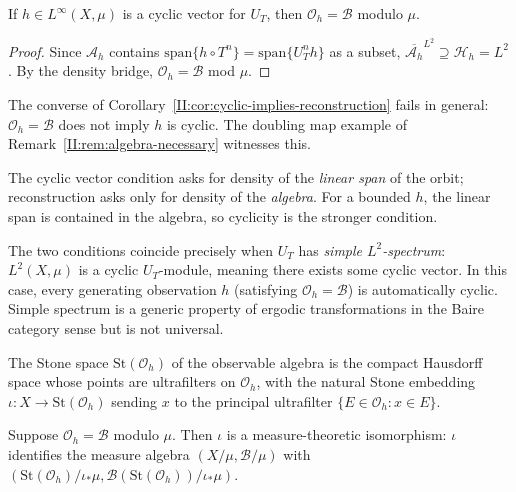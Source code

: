 \begin{corollary}
\label{II:cor:cyclic-implies-reconstruction}
If $h \in L^\infty(X, \mu)$ is a cyclic vector for $U_T$, then
$\mathcal{O}_h = \mathcal{B}$ modulo $\mu$.
\end{corollary}

\begin{proof}
Since $\mathcal{A}_h$ contains $\mathrm{span}\{h \circ T^n\} =
\mathrm{span}\{U_T^n h\}$ as a subset, $\overline{\mathcal{A}_h}^{L^2}
\supseteq \mathcal{H}_h = L^2$.  By the density bridge, $\mathcal{O}_h =
\mathcal{B}$ mod $\mu$.
\end{proof}

\begin{remark}
\label{II:rem:strict}
The converse of Corollary~\ref{II:cor:cyclic-implies-reconstruction} fails in
general: $\mathcal{O}_h = \mathcal{B}$ does not imply $h$ is cyclic.
The doubling map example of Remark~\ref{II:rem:algebra-necessary} witnesses this.

The cyclic vector condition asks for density of the \emph{linear span} of the
orbit; reconstruction asks only for density of the \emph{algebra}.  For a bounded
$h$, the linear span is contained in the algebra, so cyclicity is the stronger
condition.

The two conditions coincide precisely when $U_T$ has \emph{simple
$L^2$-spectrum}: $L^2(X,\mu)$ is a cyclic $U_T$-module, meaning there exists
some cyclic vector.  In this case, every generating observation $h$ (satisfying
$\mathcal{O}_h = \mathcal{B}$) is automatically cyclic.  Simple spectrum is
a generic property of ergodic transformations in the Baire category sense
\cite{Halmos1944} but is not universal.
\end{remark}


The Stone space $\mathrm{St}(\mathcal{O}_h)$ of the observable algebra is the
compact Hausdorff space whose points are ultrafilters on $\mathcal{O}_h$, with
the natural Stone embedding $\iota : X \to \mathrm{St}(\mathcal{O}_h)$ sending
$x$ to the principal ultrafilter $\{E \in \mathcal{O}_h : x \in E\}$.

\begin{theorem}
\label{II:thm:stone-id}
Suppose $\mathcal{O}_h = \mathcal{B}$ modulo $\mu$.  Then $\iota$ is a
measure-theoretic isomorphism: $\iota$ identifies the measure algebra
$(X/\mu, \mathcal{B}/\mu)$ with
$(\mathrm{St}(\mathcal{O}_h)/\iota_*\mu,
\mathcal{B}(\mathrm{St}(\mathcal{O}_h))/\iota_*\mu)$.
\end{theorem}

